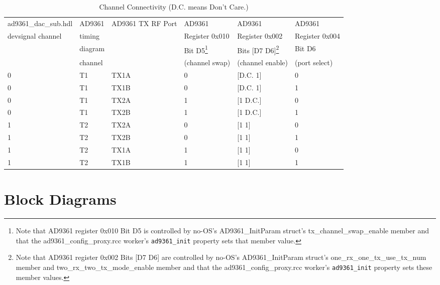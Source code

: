 \documentclass{article}
\def\comp{ad9361\_dac\_sub}
\begin{document}
\begin{scriptsize}
	\centering
	\begin{longtable}{|p{3cm}|p{1.8cm}|p{3.5cm}|p{1.9cm}|p{2.1cm}|p{2cm}|}
		\caption{Channel Connectivity (D.C. means Don't Care.)} \\
		\hline
		\rowcolor{blue}
		\comp.hdl & AD9361  & AD9361 TX RF Port & AD9361 & AD9361 & AD9361 \\
		\rowcolor{blue}
		devsignal channel & timing &   & Register 0x010 & Register 0x002 & Register 0x004 \\
		\rowcolor{blue}
		& diagram  & & Bit D5\footnote{Note that AD9361 register 0x010 Bit D5 is controlled by no-OS's AD9361\_InitParam struct's tx\_channel\_swap\_enable member\cite{adi_ug570} and that the ad9361\_config\_proxy.rcc worker's \texttt{ad9361\_init} property sets that member value\cite{config_proxy_comp_datasheet}.} & Bits [D7 D6]\footnote{Note that AD9361 register 0x002 Bits [D7 D6] are controlled by no-OS's AD9361\_InitParam struct's one\_rx\_one\_tx\_use\_tx\_num member and two\_rx\_two\_tx\_mode\_enable member\cite{adi_ug570} and that the ad9361\_config\_proxy.rcc worker's \texttt{ad9361\_init} property sets these member values\cite{config_proxy_comp_datasheet}.} & Bit D6 \\
		\rowcolor{blue}
		& channel & & (channel swap) & (channel enable) & (port select) \\
		\hline
		0 & T1 & TX1A         & 0 & [D.C. 1]  & 0 \\
		0 & T1 & TX1B         & 0 & [D.C. 1]  & 1 \\
		\hline
		0 & T1 & TX2A         & 1 & [1 D.C.] & 0 \\
		0 & T1 & TX2B         & 1 & [1 D.C.] & 1 \\
		\hline
		1 \footref{t2}  & T2 \footref{t2} & TX2A         & 0 & [1 1]  & 0 \\
		1 \footref{t2} & T2 \footref{t2} & TX2B         & 0 & [1 1]  & 1 \\
		\hline
		1 \footref{t2} & T2 \footref{t2} & TX1A         & 1 & [1 1] & 0 \\
		1 \footref{t2} & T2 \footref{t2} & TX1B         & 1 & [1 1] & 1 \\
		\hline
	\end{longtable}
\end{scriptsize}

\section*{Block Diagrams}
\end{document}
